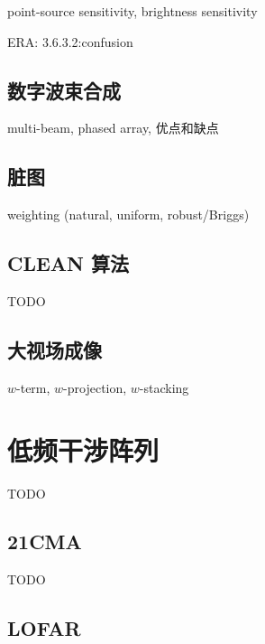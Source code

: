 point-source sensitivity, brightness sensitivity

ERA: 3.6.3.2:confusion

\subsection{数字波束合成}

multi-beam, phased array, 优点和缺点

\subsection{脏图}

weighting (natural, uniform, robust/Briggs)

\subsection{CLEAN 算法}

TODO

\subsection{大视场成像}

$w$-term, $w$-projection, $w$-stacking


\section{低频干涉阵列}
\label{sec:instruments}

TODO

\subsection{21CMA}

TODO

\subsection{LOFAR}

